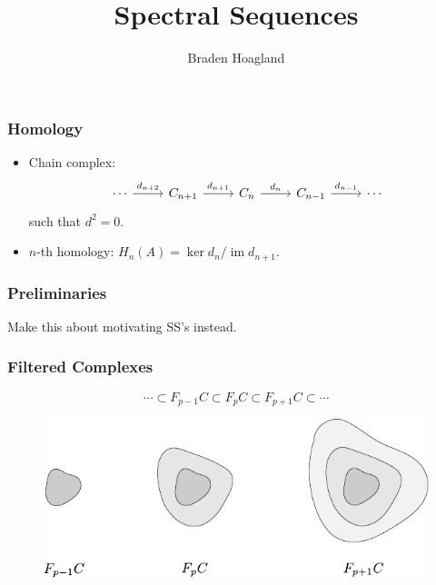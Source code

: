 \documentclass{beamer}
\title{Spectral Sequences}
\author{Braden Hoagland}
\institute{Math 502: Algebraic Structures II}
\date{}
\DeclareMathOperator{\im}{im}
\begin{document}

\begin{frame}
	\titlepage
\end{frame}


\begin{frame}[fragile]
	\frametitle{Homology}

	\begin{itemize}
		\item Chain complex:
	\begin{equation*}
		\begin{tikzcd}
			\cdots\rar{d_{n+2}}&C_{n+1}\rar{d_{n+1}}&C_n\rar{d_n}&C_{n-1}\rar{d_{n-1}}&\cdots
		\end{tikzcd}
	\end{equation*}
	such that $d^{2}=0$.

		\item $n$-th homology: $H_{n}(A) = \ker d_n / \im d_{n+1}$.
	\end{itemize}
\end{frame}


\begin{frame}
	\frametitle{Preliminaries}

	{\color{red}Make this about motivating SS's instead.}
\end{frame}


\begin{frame}
	\frametitle{Filtered Complexes}

	\[
		\cdots \subset F_{p-1}C \subset F_{p}C\subset F_{p+1}C \subset \cdots
	\] 
	\begin{figure}[H]
		\centering
		\includegraphics[scale=1]{fig/filtration.pdf}
	\end{figure}
\end{frame}
\end{document}
